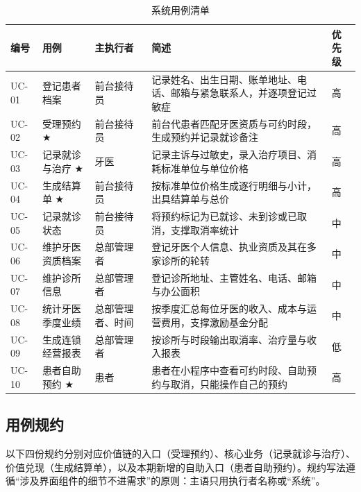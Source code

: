\documentclass[11pt,a4paper]{ctexart}
\begin{document}
\begin{table}[H]
\centering
\caption{系统用例清单}
\begin{tabularx}{\linewidth}{@{}L{1.3cm}L{3.4cm}L{2.9cm}X L{1.3cm}@{}}
\toprule
\textbf{\textcolor{adcblue!92}{编号}} & \textbf{\textcolor{adcblue!92}{用例}} & \textbf{\textcolor{adcblue!92}{主执行者}} & \textbf{\textcolor{adcblue!92}{简述}} & \textbf{\textcolor{adcblue!92}{优先级}} \\
\midrule
UC-01 & 登记患者档案 & 前台接待员 & 记录姓名、出生日期、账单地址、电话、邮箱与紧急联系人，并逐项登记过敏症 & 高 \\
UC-02 & 受理预约 $\bigstar$ & 前台接待员 & 前台代患者匹配牙医资质与可约时段，生成预约并记录就诊备注 & 高 \\
UC-03 & 记录就诊与治疗 $\bigstar$ & 牙医 & 记录主诉与过敏史，录入治疗项目、消耗标准单位与单位价格 & 高 \\
UC-04 & 生成结算单 $\bigstar$ & 前台接待员 & 按标准单位价格生成逐行明细与小计，出具结算单与总价 & 高 \\
UC-05 & 记录就诊状态 & 前台接待员 & 将预约标记为已就诊、未到诊或已取消，支撑取消率统计 & 中 \\
UC-06 & 维护牙医资质档案 & 总部管理者 & 登记牙医个人信息、执业资质及其在多家诊所的轮转 & 中 \\
UC-07 & 维护诊所信息 & 总部管理者 & 登记诊所地址、主管姓名、电话、邮箱与办公面积 & 中 \\
UC-08 & 统计牙医季度业绩 & 总部管理者、时间 & 按季度汇总每位牙医的收入、成本与运营费用，支撑激励基金分配 & 中 \\
UC-09 & 生成连锁经营报表 & 总部管理者 & 按诊所与时段输出取消率、治疗量与收入报表 & 低 \\
UC-10 & 患者自助预约 $\bigstar$ & 患者 & 患者在小程序中查看可约时段、自助预约与取消，只能操作自己的预约 & 高 \\
\bottomrule
\end{tabularx}
\vspace{2pt}
\par{}
\end{table}

\subsection{用例规约}

以下四份规约分别对应价值链的入口（受理预约）、核心业务（记录就诊与治疗）、价值兑现（生成结算单），以及本期新增的自助入口（患者自助预约）。规约写法遵循“涉及界面组件的细节不进需求”的原则：主语只用执行者名称或“系统”。
\end{document}
